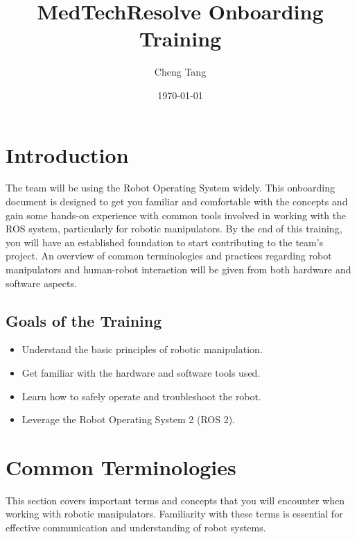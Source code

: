 \documentclass{article}
\title{MedTechResolve Onboarding Training}
\author{Cheng Tang}
\date{\today}
\begin{document}
\maketitle

\tableofcontents
\newpage

\section{Introduction}
The team will be using the Robot Operating System widely. This onboarding document is designed to get you familiar and comfortable with the concepts and gain some hands-on experience with common tools involved in working with the ROS system, particularly for robotic manipulators. By the end of this training, you will have an established foundation to start contributing to the team's project. An overview of common terminologies and practices regarding robot manipulators and human-robot interaction will be given from both hardware and software aspects.

\subsection{Goals of the Training}
\begin{itemize}
    \item Understand the basic principles of robotic manipulation.
    \item Get familiar with the hardware and software tools used.
    \item Learn how to safely operate and troubleshoot the robot.
    \item Leverage the Robot Operating System 2 (ROS 2).
\end{itemize}

\section{Common Terminologies}
This section covers important terms and concepts that you will encounter when working with robotic manipulators. Familiarity with these terms is essential for effective communication and understanding of robot systems.
\end{document}
